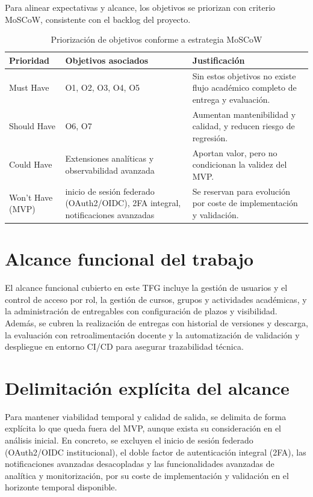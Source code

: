 Para alinear expectativas y alcance,
los objetivos se priorizan con criterio MoSCoW,
consistente con el backlog del proyecto.

\begin{table}[!htbp]
\centering
\begin{tabular}{|P{2.2cm}|P{4.8cm}|P{5.4cm}|}
\hline
\textbf{Prioridad} & \textbf{Objetivos asociados} & \textbf{Justificaci\'on} \\
\hline
Must Have & O1, O2, O3, O4, O5 & Sin estos objetivos no existe flujo acad\'emico completo de entrega y evaluaci\'on. \\
\hline
Should Have & O6, O7 & Aumentan mantenibilidad y calidad, y reducen riesgo de regresi\'on. \\
\hline
Could Have & Extensiones anal\'iticas y observabilidad avanzada & Aportan valor, pero no condicionan la validez del MVP. \\
\hline
Won't Have (MVP) & inicio de sesi\'on federado (OAuth2/OIDC), 2FA integral, notificaciones avanzadas & Se reservan para evoluci\'on por coste de implementaci\'on y validaci\'on. \\
\hline
\end{tabular}
\caption{Priorizaci\'on de objetivos conforme a estrategia MoSCoW}
\label{tab:priorizacion-objetivos}
\end{table}

\FloatBarrier
\section{Alcance funcional del trabajo}

El alcance funcional cubierto en este TFG incluye la gesti\'on de usuarios y el control de acceso por rol, la gesti\'on de cursos, grupos y actividades acad\'emicas, y la administraci\'on de entregables con configuraci\'on de plazos y visibilidad. Adem\'as, se cubren la realizaci\'on de entregas con historial de versiones y descarga, la evaluaci\'on con retroalimentaci\'on docente y la automatizaci\'on de validaci\'on y despliegue en entorno CI/CD para asegurar trazabilidad t\'ecnica.

\FloatBarrier
\section{Delimitaci\'on expl\'icita del alcance}

Para mantener viabilidad temporal y calidad de salida,
se delimita de forma expl\'icita lo que queda fuera del MVP,
aunque exista su consideraci\'on en el an\'alisis inicial. En concreto, se excluyen el inicio de sesi\'on federado (OAuth2/OIDC institucional), el doble factor de autenticaci\'on integral (2FA), las notificaciones avanzadas desacopladas y las funcionalidades avanzadas de anal\'itica y monitorizaci\'on, por su coste de implementaci\'on y validaci\'on en el horizonte temporal disponible.

